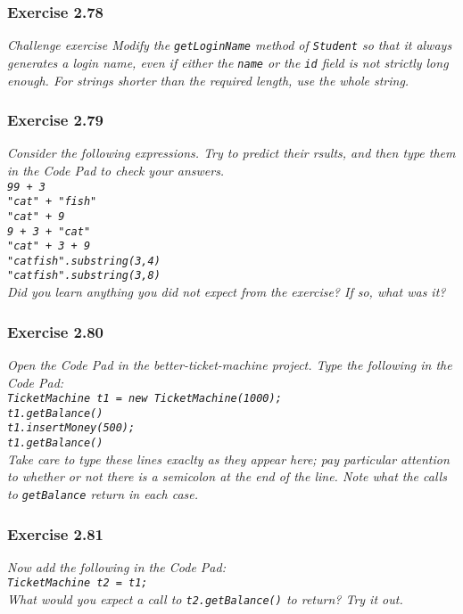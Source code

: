 \subsubsection*{Exercise 2.78}
\textit{Challenge exercise Modify the \lstinline{getLoginName} method of 
\lstinline{Student} so that it always generates a login name, even if either 
the \lstinline{name} or the \lstinline{id} field is not strictly long enough. 
For strings shorter than the required length, use the whole string. }\\

\subsubsection*{Exercise 2.79}
\textit{Consider the following expressions. Try to predict their rsults, and 
then type them in the Code Pad to check your answers. \\
\lstinline{99 + 3}\\
\lstinline{"cat" + "fish"}\\
\lstinline{"cat" + 9}\\
\lstinline{9 + 3 + "cat"}\\
\lstinline{"cat" + 3 + 9}\\
\lstinline{"catfish".substring(3,4)}\\
\lstinline{"catfish".substring(3,8)}\\
Did you learn anything you did not expect from the exercise? If so, what was 
it? }\\

\subsubsection*{Exercise 2.80}
\textit{Open the Code Pad in the better-ticket-machine project. Type the 
following in the Code Pad: \\
\lstinline{TicketMachine t1 = new TicketMachine(1000);}\\
\lstinline{t1.getBalance()}\\
\lstinline{t1.insertMoney(500);}\\
\lstinline{t1.getBalance()}\\
Take care to type these lines exaclty as they appear here; pay particular 
attention to whether or not there is a semicolon at the end of the line. Note 
what the calls to \lstinline{getBalance} return in each case. 
}\\

\subsubsection*{Exercise 2.81}
\textit{Now add the following in the Code Pad: \\
\lstinline{TicketMachine t2 = t1;}\\
What would you expect a call to \lstinline{t2.getBalance()} to return? Try it 
out. }\\

